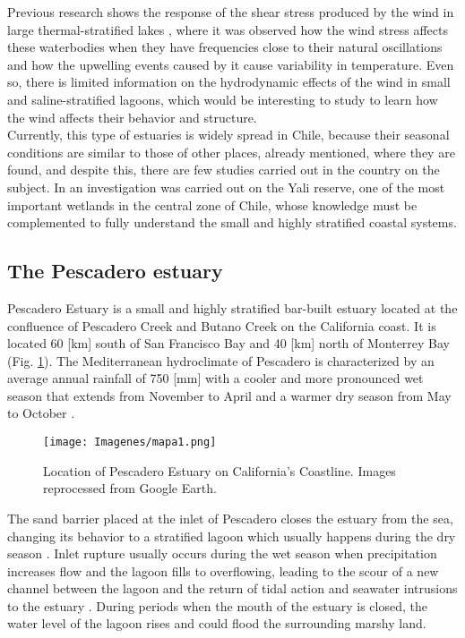 \documentclass[tesis.tex]{subfiles}
\begin{document}
Previous research shows the response of the shear stress produced by the wind in large thermal-stratified lakes \citep{Coman2012, Laval2008, avalos2019natural}, where it was observed how the wind stress affects these waterbodies when they have frequencies close to their natural oscillations and how the upwelling events caused by it cause variability in temperature. Even so, there is limited information on the hydrodynamic effects of the wind in small and saline-stratified lagoons, which would be interesting to study to learn how the wind affects their behavior and structure.\\

Currently, this type of estuaries is widely spread in Chile, because their seasonal conditions are similar to those of other places, already mentioned, where they are found, and despite this, there are few studies carried out in the country on the subject. In \cite{dussaillant2009} an investigation was carried out on the Yali reserve, one of the most important wetlands in the central zone of Chile, whose knowledge must be complemented to fully understand the small and highly stratified coastal systems.\\

\subsection{The Pescadero estuary}

Pescadero Estuary is a small and highly stratified bar-built estuary located at the confluence of Pescadero Creek and Butano Creek on the California coast. It is located 60 [km] south of San Francisco Bay and 40 [km] north of Monterrey Bay (Fig. \ref{fig:locPDO}). The Mediterranean hydroclimate of Pescadero is characterized by an average annual rainfall of 750 [mm] with a cooler and more pronounced wet season that extends from November to April and a warmer dry season from May to October  \citep{climatedata2021}.\\

\begin{figure}[h!]
\centering
\texttt{[image: Imagenes/mapa1.png]}
\caption{Location of Pescadero Estuary on California's Coastline. Images reprocessed from Google Earth.}
\label{fig:locPDO}
\end{figure}

The sand barrier placed at the inlet of Pescadero closes the estuary from the sea, changing its behavior to a stratified lagoon which usually happens during the dry season \citep{Williams2014}. Inlet rupture usually occurs during the wet season when precipitation increases flow and the lagoon fills to overflowing, leading to the scour of a new channel between the lagoon and the return of tidal action and seawater intrusions to the estuary \citep{largier2015}. During periods when the mouth of the estuary is closed, the water level of the lagoon rises and could flood the surrounding marshy land. \\
\end{document}
